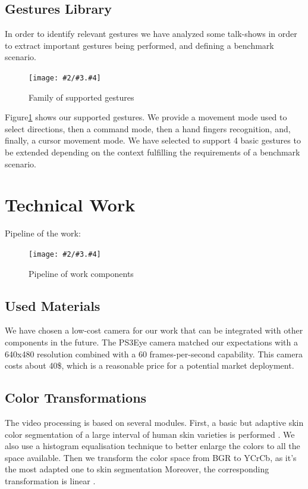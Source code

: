 \documentclass{llncs}
\newcommand\ignore[1]{}
\newcommand{\imagepathext}[5]{%
\begin{figure}[!htbp]
\hfil\texttt{[image: \#2/\#3.\#4]}\hfil
\caption{#5\label{#3}}
\end{figure}}
\newcommand{\png}[2]{\imagepathext{width=\columnwidth}{pics}{#1}{png}{#2}}
\begin{document}
\subsection{Gestures Library}

In order to identify relevant gestures we have analyzed some talk-shows in order to extract important gestures being performed, and defining a benchmark scenario. 

\png{handg}{Family of supported gestures}

Figure\ref{handg} shows our supported gestures. We provide a movement mode
used to select directions, then a command mode, then a hand fingers recognition,
and, finally, a cursor movement mode.
\pagebreak 
We have selected to support 4 basic gestures to be extended depending on the
context fulfilling the requirements of a benchmark scenario.

\ignore{
Explanation of the figures
Steps for skin-color based gesture detection
}

\section{Technical Work}

Pipeline of the work:

\png{pipeline}{Pipeline of work components}

\subsection{Used Materials}
We have chosen a low-cost camera for our work that can be integrated with other components in the future.
The PS3Eye camera matched our expectations with a 640x480 resolution combined with a 60 frames-per-second capability.
This camera costs about 40\$, which is a reasonable price for a potential market deployment.

\ignore{
} 

\subsection{Color Transformations}
The video processing is based on several modules. First, a basic but adaptive skin color segmentation of a large interval of human skin varieties is performed \cite{skinColorSeg}.
We also use a histogram equalisation technique to better enlarge the colors to all the space available.
Then we transform the color space from BGR to YCrCb, as it’s the most adapted one to skin segmentation
Moreover, the corresponding transformation is linear \cite{skinColorSeg}.
\end{document}
